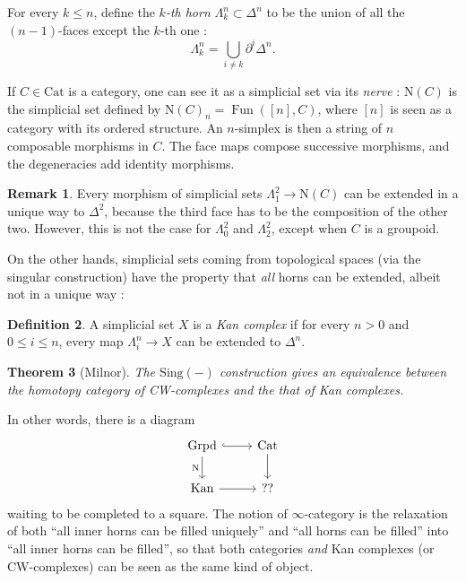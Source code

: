 \documentclass[11pt]{article}
\newtheorem{theorem}{Theorem}[section]
\theoremstyle{definition}
\newtheorem{definition}[theorem]{Definition}
\newtheorem{remark}[theorem]{Remark}
\newcommand{\Cat}{\mathrm{Cat}}
\newcommand{\Fun}{\operatorname{Fun}}
\newcommand{\Grpd}{\mathrm{Grpd}}
\newcommand{\Kan}{\mathrm{Kan}}
\newcommand{\N}{\mathrm{N}}
\begin{document}
For every $k \leqslant n$, define the \emph{$k$-th horn} $\Lambda_k^n \subset \Delta^n$ to be the union of all the $(n-1)$-faces except the $k$-th one :
\[
    \Lambda_k^n = \bigcup_{i \neq k} \partial^i \Delta^n.
\]

If $C \in \Cat$ is a category, one can see it as a simplicial set via its \emph{nerve} : $\N(C)$ is the simplicial set defined by $\N(C)_n = \Fun([n], C)$, where $[n]$ is seen as a category with its ordered structure.
An $n$-simplex is then a string of $n$ composable morphisms in $C$.
The face maps compose successive morphisms, and the degeneracies add identity morphisms.

\begin{remark}
    Every morphism of simplicial sets $\Lambda_1^2 \to \N(C)$ can be extended in a unique way to $\Delta^2$, because the third face has to be the composition of the other two.
    However, this is not the case for $\Lambda_0^2$ and $\Lambda_2^2$, except when $C$ is a groupoid.
\end{remark}

On the other hands, simplicial sets coming from topological spaces (via the singular construction) have the property that \emph{all} horns can be extended, albeit not in a unique way :

\begin{definition}
    A simplicial set $X$ is a \emph{Kan complex} if for every $n > 0$ and $0 \leqslant i \leqslant n$, every map $\Lambda_i^n \to X$ can be extended to $\Delta^n$.
\end{definition}

\begin{theorem}[Milnor]
    The $\mathrm{Sing}(-)$ construction gives an equivalence between the homotopy category of CW-complexes and the that of Kan complexes.
\end{theorem}

In other words, there is a diagram
\[\begin{tikzcd}
	\Grpd & \Cat \\
	\Kan & {??}
	\arrow[hook, from=1-1, to=1-2]
	\arrow["\N"', from=1-1, to=2-1]
	\arrow[from=1-2, to=2-2]
	\arrow[from=2-1, to=2-2]
\end{tikzcd}\]
waiting to be completed to a square.
The notion of $\infty$-category is the relaxation of both \enquote{all inner horns can be filled uniquely} and \enquote{all horns can be filled} into \enquote{all inner horns can be filled}, so that both categories \emph{and} Kan complexes (or CW-complexes) can be seen as the same kind of object.
\end{document}

